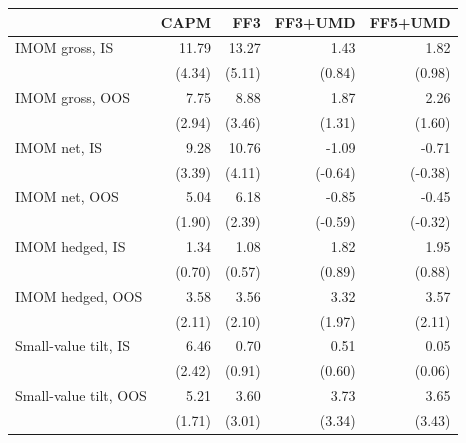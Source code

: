 \begin{tabular}{lrrrr}
\toprule
 & CAPM & FF3 & FF3+UMD & FF5+UMD \\
\midrule
IMOM gross, IS & 11.79 & 13.27 & 1.43 & 1.82 \\
 & (4.34) & (5.11) & (0.84) & (0.98) \\[2pt]
IMOM gross, OOS & 7.75 & 8.88 & 1.87 & 2.26 \\
 & (2.94) & (3.46) & (1.31) & (1.60) \\[2pt]
IMOM net, IS & 9.28 & 10.76 & -1.09 & -0.71 \\
 & (3.39) & (4.11) & (-0.64) & (-0.38) \\[2pt]
IMOM net, OOS & 5.04 & 6.18 & -0.85 & -0.45 \\
 & (1.90) & (2.39) & (-0.59) & (-0.32) \\[2pt]
IMOM hedged, IS & 1.34 & 1.08 & 1.82 & 1.95 \\
 & (0.70) & (0.57) & (0.89) & (0.88) \\[2pt]
IMOM hedged, OOS & 3.58 & 3.56 & 3.32 & 3.57 \\
 & (2.11) & (2.10) & (1.97) & (2.11) \\[2pt]
Small-value tilt, IS & 6.46 & 0.70 & 0.51 & 0.05 \\
 & (2.42) & (0.91) & (0.60) & (0.06) \\[2pt]
Small-value tilt, OOS & 5.21 & 3.60 & 3.73 & 3.65 \\
 & (1.71) & (3.01) & (3.34) & (3.43) \\[2pt]
\bottomrule
\end{tabular}
